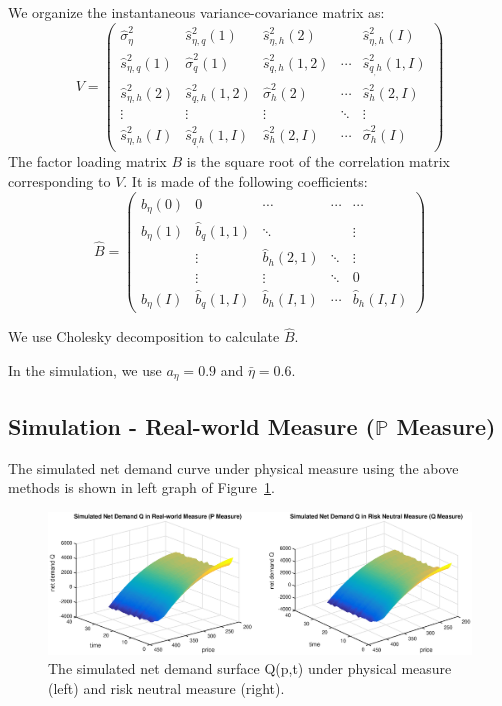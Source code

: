 \documentclass{article}
\begin{document}
We organize the instantaneous variance-covariance matrix as:%
\[
V=\left(
\begin{array}{ccccc}
\hat{\sigma}_{\eta }^{2} & \hat{s}_{\eta ,q}^{2}(1) & \hat{s}_{\eta
,h}^{2}(2) &  & \hat{s}_{\eta ,h}^{2}(I) \\
\hat{s}_{\eta ,q}^{2}(1) & \hat{\sigma}_{q}^{2}(1) & \hat{s}_{q,h}^{2}(1,2)
& \cdots  & \hat{s}_{q_{,}h}^{2}(1,I) \\
\hat{s}_{\eta ,h}^{2}(2) & \hat{s}_{q,h}^{2}(1,2) & \hat{\sigma}_{h}^{2}(2)
& \cdots  & \hat{s}_{h}^{2}(2,I) \\
\vdots  & \vdots  & \vdots  & \ddots  & \vdots  \\
\hat{s}_{\eta ,h}^{2}(I) & \hat{s}_{q_{,}h}^{2}(1,I) & \hat{s}_{h}^{2}(2,I)
& \cdots  & \hat{\sigma}_{h}^{2}(I)%
\end{array}%
\right)
\]%
The factor loading matrix $B$ is the square root of the correlation matrix
corresponding to $V$. It is made of the following coefficients:%
\[
\hat{B}=\left(
\begin{array}{ccccc}
\hat{b}_{\eta }(0) & 0 & \cdots  & \cdots  & \cdots  \\
\hat{b}_{\eta }(1) & \hat{b}_{q}(1,1) & \ddots  &  & \vdots  \\
& \vdots  & \hat{b}_{h}(2,1) & \ddots  & \vdots  \\
& \vdots  & \vdots  & \ddots  & 0 \\
\hat{b}_{\eta }(I) & \hat{b}_{q}(1,I) & \hat{b}_{h}(I,1) & \cdots  & \hat{b}%
_{h}(I,I)%
\end{array}%
\right)
\]

We use Cholesky decomposition to calculate $\hat{B}.$

\bigskip

In the simulation, we use $a_\eta = 0.9$ and $\bar{\eta}=0.6$.


\subsection{Simulation - Real-world Measure ($\mathbb{P}$ Measure)}

The simulated net demand curve under physical measure using the above
methods is shown in left graph of Figure~\ref{fig::AAPL_20110401_simulated_both_measures}.

\begin{center}
\begin{figure}[tbp]
\centering
\includegraphics[scale = 0.5]{Q_both_measures.eps}\newline
\caption{The simulated net demand surface Q(p,t) under physical measure
(left) and risk neutral measure (right).}
\label{fig::AAPL_20110401_simulated_both_measures}
\end{figure}
\end{center}
\end{document}
